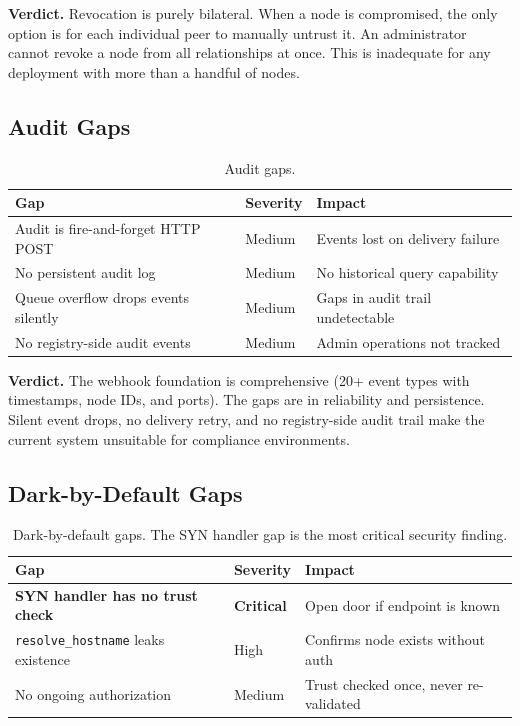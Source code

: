 \documentclass[11pt,a4paper]{article}
\begin{document}
\textbf{Verdict.} Revocation is purely bilateral. When a node is compromised, the only option is for each individual peer to manually untrust it. An administrator cannot revoke a node from all relationships at once. This is inadequate for any deployment with more than a handful of nodes.

\subsection{Audit Gaps}

\begin{table}[h]
\centering
\begin{tabular}{@{}lll@{}}
\toprule
\textbf{Gap} & \textbf{Severity} & \textbf{Impact} \\
\midrule
Audit is fire-and-forget HTTP POST & Medium & Events lost on delivery failure \\
No persistent audit log & Medium & No historical query capability \\
Queue overflow drops events silently & Medium & Gaps in audit trail undetectable \\
No registry-side audit events & Medium & Admin operations not tracked \\
\bottomrule
\end{tabular}
\caption{Audit gaps.}
\end{table}

\textbf{Verdict.} The webhook foundation is comprehensive (20+ event types with timestamps, node IDs, and ports). The gaps are in reliability and persistence. Silent event drops, no delivery retry, and no registry-side audit trail make the current system unsuitable for compliance environments.

\subsection{Dark-by-Default Gaps}

\begin{table}[h]
\centering
\begin{tabular}{@{}lll@{}}
\toprule
\textbf{Gap} & \textbf{Severity} & \textbf{Impact} \\
\midrule
\textbf{SYN handler has no trust check} & \textbf{Critical} & Open door if endpoint is known \\
\texttt{resolve\_hostname} leaks existence & High & Confirms node exists without auth \\
No ongoing authorization & Medium & Trust checked once, never re-validated \\
\bottomrule
\end{tabular}
\caption{Dark-by-default gaps. The SYN handler gap is the most critical security finding.}
\end{table}
\end{document}
